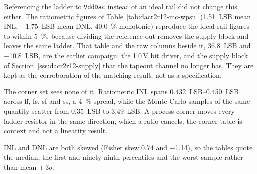 Referencing the ladder to \texttt{VddDac} instead of an ideal rail did not change this
either. The ratiometric figures of Table~\ref{tab:dacr2r12-mc-wpsu}
(\SI{1.51}{LSB} mean INL, \SI{-1.75}{LSB} mean DNL, \SI{40.0}{\percent} monotonic)
reproduce the ideal-rail figures to within \SI{5}{\percent}, because dividing the
reference out removes the supply block and leaves the same ladder. That table and the raw
columns beside it, \SI{36.8}{LSB} and \SI{-10.8}{LSB}, are the earlier campaign: the
1.0\,V bit driver, and the supply block of Section~\ref{sss:dacr2r12-supply} that the
tapeout channel no longer has. They are kept as the corroboration of the matching result,
not as a specification.

The corner set sees none of it. Ratiometric INL spans \SIrange{0.432}{0.450}{LSB} across
ff, fs, sf and ss, a \SI{4}{\percent} spread, while the Monte Carlo samples of the
same quantity scatter from \SI{0.35}{LSB} to \SI{3.49}{LSB}. A process corner moves every
ladder resistor in the same direction, which a ratio cancels; the corner table is context
and not a linearity result.

INL and DNL are both skewed (Fisher skew \num{+0.74} and \num{-1.14}), so the tables
quote the median, the first and ninety-ninth percentiles and the worst sample rather than
mean \(\pm\,3\sigma\).
